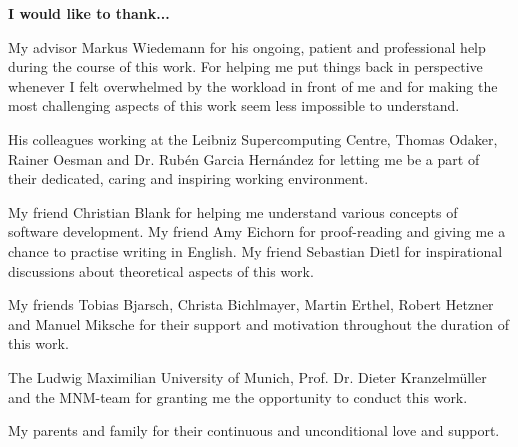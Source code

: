\vspace*{2cm}

   \textbf{I would like to thank...}


\vspace*{1cm}

My advisor Markus Wiedemann for his ongoing, patient and professional help during the course of this work. For helping me put things back in perspective whenever I felt overwhelmed by the workload in front of me and for making the most challenging aspects of this work seem less impossible to understand.


\vspace*{1cm}
His colleagues working at the Leibniz Supercomputing Centre, Thomas Odaker, Rainer Oesman and Dr. Rub\'{e}n Garcia Hern\'{a}ndez for letting me be a part of their dedicated, caring and inspiring working environment.


\vspace*{1cm}
My friend Christian Blank for helping me understand various concepts of software development. My friend Amy Eichorn for proof-reading and giving me a chance to practise writing in English. My friend Sebastian Dietl for inspirational discussions about theoretical aspects of this work.


\vspace*{1cm}
My friends Tobias Bjarsch, Christa Bichlmayer, Martin Erthel, Robert Hetzner and Manuel Miksche for their support and motivation throughout the duration of this work.


\vspace*{1cm}
The Ludwig Maximilian University of Munich, Prof. Dr. Dieter Kranzelm\"uller and the MNM-team for granting me the opportunity to conduct this work.


\vspace*{1cm}
My parents and family for their continuous and unconditional love and support.
